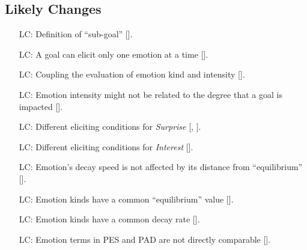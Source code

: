 \subsection{Likely Changes}\label{sec_Expand}

\noindent \begin{itemize}

    \item[LC\refstepcounter{lcnum}\thelcnum\label{LC_Subgoal}:]
    Definition of ``sub-goal'' [].

    \item[LC\refstepcounter{lcnum}\thelcnum\label{LC_Goal2Emotion}:]
    A goal can elicit only one emotion at a time [].

    \item[LC\refstepcounter{lcnum}\thelcnum\label{LC_EmotionTypeIntensity}:]
    Coupling the evaluation of emotion kind and intensity 
    [].

    \item[LC\refstepcounter{lcnum}\thelcnum\label{LC_Goal2Intensity}:]
    Emotion intensity might not be related to the degree that a goal is 
    impacted [].

    \item[LC\refstepcounter{lcnum}\thelcnum\label{LC_Surprise}:]
    Different eliciting conditions for \textit{Surprise} [, 
    ].

    \item[LC\refstepcounter{lcnum}\thelcnum\label{LC_Interest}:]
    Different eliciting conditions for \textit{Interest} [].

    \item[LC\refstepcounter{lcnum}\thelcnum\label{LC_DecaySpeed}:]
    Emotion's decay speed is not affected by its distance from ``equilibrium'' 
    [].

    \item[LC\refstepcounter{lcnum}\thelcnum\label{LC_Equilibrium}:]
    Emotion kinds have a common ``equilibrium'' value [].

    \item[LC\refstepcounter{lcnum}\thelcnum\label{LC_DecayRate}:]
    Emotion kinds have a common decay rate [].

    \item[LC\refstepcounter{lcnum}\thelcnum\label{LC_EmotionTerms}:]
    Emotion terms in PES and PAD are not directly comparable 
    [].


\end{itemize}
